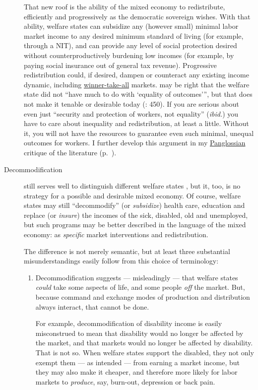 \begin{description}
	That new roof is the ability of the mixed economy to redistribute, efficiently and progressively as the democratic sovereign wishes. With that ability, welfare states can subsidize any (however small) minimal labor market income to any desired minimum standard of living (for example, through a \gls{NIT}), and can provide any level of social protection desired without counterproductively burdening low incomes (for example, by paying social insurance out of general tax revenue). Progressive redistribution could, if desired, dampen or counteract any existing income dynamic, including \hyperref[sec:winner-take-all]{winner-take-all} markets. \citeauthor{Offe2003} may be right that the welfare state did not ``have much to do with `equality of outcomes''', but that does not make it tenable or desirable today (\citeyear{Offe2003}: 450). If you are serious about even just ``security and protection of workers, not equality'' (\emph{ibid.}) you have to care about inequality and redistribution, at least a little. Without it, you will not have the resources to guarantee even such minimal, unequal outcomes for workers. I further develop this argument  in my \hyperref[sec:Pangloss]{Panglossian} critique of the literature (p.~\pageref{sec:Pangloss}).

	\item[Decommodification] still serves well to distinguish different welfare states \citep{Esping-Andersen-1990-aa}, but it, too, is no strategy for a possible and desirable mixed economy.  Of course, welfare states may still ``decommodify'' (or \emph{subsidize}) health care, education and replace (or \emph{insure}) the incomes of the sick, disabled, old and unemployed, but such programs may be better described in the language of the mixed economy: as \emph{specific} market interventions and redistribution. 
	
	The difference is not merely semantic, but at least three substantial misunderstandings easily follow from this choice of terminology:
	\begin{enumerate}
		\item Decommodification suggests --- misleadingly --- that welfare states \emph{could} take some aspects of life, and some people \emph{off} the market. But, because command and exchange modes of production and distribution always interact, that cannot be done. 
		
		For example, decommodification of disability income is easily misconstrued to mean that disability would no longer be affected by the market, and that markets would no longer be affected by disability. That is not so. When welfare states support the disabled, they not only exempt them --- as intended --- from earning a market income, but they may also make it cheaper, and therefore more likely for labor markets to \emph{produce}, say, burn-out, depression or back pain. 
		

\end{enumerate}
\end{description}
